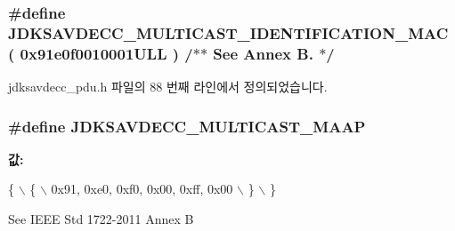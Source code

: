 \subsubsection[{\texorpdfstring{J\+D\+K\+S\+A\+V\+D\+E\+C\+C\+\_\+\+M\+U\+L\+T\+I\+C\+A\+S\+T\+\_\+\+I\+D\+E\+N\+T\+I\+F\+I\+C\+A\+T\+I\+O\+N\+\_\+\+M\+AC}{JDKSAVDECC_MULTICAST_IDENTIFICATION_MAC}}]{\setlength{\rightskip}{0pt plus 5cm}\#define J\+D\+K\+S\+A\+V\+D\+E\+C\+C\+\_\+\+M\+U\+L\+T\+I\+C\+A\+S\+T\+\_\+\+I\+D\+E\+N\+T\+I\+F\+I\+C\+A\+T\+I\+O\+N\+\_\+\+M\+AC~( 0x91e0f0010001\+U\+L\+L ) /$\ast$$\ast$ See Annex B. $\ast$/}\hypertarget{group__pdu_gac2ca68780ed2131f86809c9a25b7a0bd}{}\label{group__pdu_gac2ca68780ed2131f86809c9a25b7a0bd}


jdksavdecc\+\_\+pdu.\+h 파일의 88 번째 라인에서 정의되었습니다.

\subsubsection[{\texorpdfstring{J\+D\+K\+S\+A\+V\+D\+E\+C\+C\+\_\+\+M\+U\+L\+T\+I\+C\+A\+S\+T\+\_\+\+M\+A\+AP}{JDKSAVDECC_MULTICAST_MAAP}}]{\setlength{\rightskip}{0pt plus 5cm}\#define J\+D\+K\+S\+A\+V\+D\+E\+C\+C\+\_\+\+M\+U\+L\+T\+I\+C\+A\+S\+T\+\_\+\+M\+A\+AP}\hypertarget{group__pdu_gabb18a7f0144e3a35d9a4faee7485132c}{}\label{group__pdu_gabb18a7f0144e3a35d9a4faee7485132c}
{\bfseries 값\+:}
\begin{DoxyCode}
\{                                                                                                          
                      \(\backslash\)
        \{                                                                                                  
                          \(\backslash\)
            0x91, 0xe0, 0xf0, 0x00, 0xff, 0x00                                                             
                          \(\backslash\)
        \}                                                                                                  
                          \(\backslash\)
    \}
\end{DoxyCode}
See I\+E\+EE Std 1722-\/2011 Annex B 

